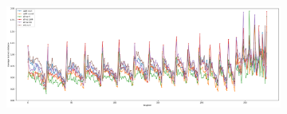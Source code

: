 \documentclass[a4,center,fleqn]{NAR}
\begin{document}
\begin{figure}[t]
    \centering
    \begin{subfigure}[b]{\textwidth}
        \includegraphics[width=\textwidth]{figures/orbit-distances_all.png}
        \caption{}
        \label{fig:orbit-distances_all}
    \end{subfigure}


\end{figure}
\end{document}
